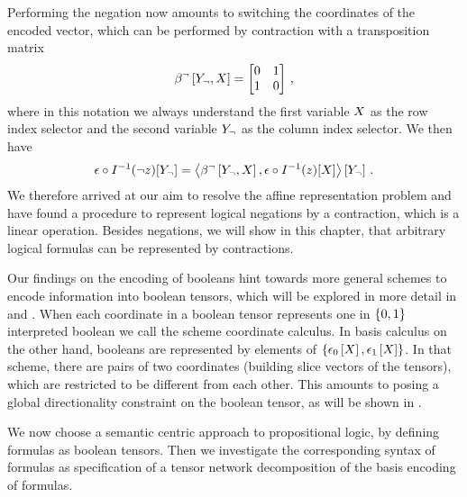Performing the negation now amounts to switching the coordinates of the encoded vector, which can be performed by contraction with a transposition matrix
\begin{align*}
	\beta^{\lnot}\left[Y_{\lnot},X\right] = 
	\begin{bmatrix}
		0 & 1 \\
		1 & 0
	\end{bmatrix} \, ,
\end{align*}
where in this notation we always understand the first variable $X$ as the row index selector and the second variable $Y_{\lnot}$ as the column index selector.
We then have
\begin{align*}
	\epsilon\circ I^{-1}(\lnot z)[Y_{\lnot}]
	= \left\langle \beta^{\lnot}\left[Y_{\lnot},X\right],\epsilon\circ I^{-1}(z)[X]\right\rangle \left[ Y_{\lnot} \right] \, .
\end{align*}
We therefore arrived at our aim to resolve the affine representation problem and have found a procedure to represent logical negations by a contraction, which is a linear operation.
Besides negations, we will show in this chapter, that arbitrary logical formulas can be represented by contractions.


Our findings on the encoding of booleans hint towards more general schemes to encode information into boolean tensors, which will be explored in more detail in  and .
When each coordinate in a boolean tensor represents one in $\{0,1\}$ interpreted boolean we call the scheme coordinate calculus.
In basis calculus on the other hand, booleans are represented by elements of $\{\epsilon_0\left[X\right],\epsilon_1\left[X\right]\}$.
In that scheme, there are pairs of two coordinates (building slice vectors of the tensors), which are restricted to be different from each other.
This amounts to posing a global directionality constraint on the boolean tensor, as will be shown in .


We now choose a semantic centric approach to propositional logic, by defining formulas as boolean tensors.
Then we investigate the corresponding syntax of formulas as specification of a tensor network decomposition of the basis encoding of formulas.

